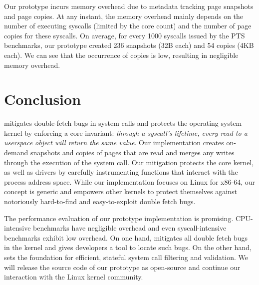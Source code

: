 \documentclass[letterpaper,twocolumn,10pt, anonymous]{article}
\begin{document}
Our prototype incurs memory overhead due to metadata tracking page snapshots
and page copies. 
At any instant, the memory overhead mainly depends on the number of executing 
syscalls (limited by the core count) and the number of page copies for these 
syscalls.
On average, for every 1000 syscalls issued by the PTS benchmarks, our prototype
created 236 snapshots (32B each) and 54 copies (4KB each).
We can see that the occurrence of copies is low, resulting in negligible 
memory overhead.


\section{Conclusion}

\tiktok mitigates double-fetch bugs in system calls and protects the operating
system kernel by enforcing a core invariant:  \emph{through a syscall's
lifetime, every read to a userspace object will return the same value}.
Our \tiktok implementation creates on-demand snapshots and copies of pages that
are read and merges any writes through the execution of the system call.
%
Our mitigation protects the core kernel, as well as drivers by carefully
instrumenting functions that interact with the process address space. While our
implementation focuses on Linux for x86-64, our concept is generic and empowers
other kernels to protect themselves against notoriously hard-to-find and
easy-to-exploit double fetch bugs.

The performance evaluation of our prototype implementation is promising.
CPU-intensive benchmarks have negligible overhead and even syscall-intensive
benchmarks exhibit low overhead. On one hand, \tiktok mitigates all double fetch
bugs in the kernel and gives developers a tool to locate such bugs. On the other
hand, \tiktok sets the foundation for efficient, stateful system call filtering
and validation. 
%
We will release the source code of our
prototype as open-source and continue our interaction with the Linux kernel
community.




\end{document}

